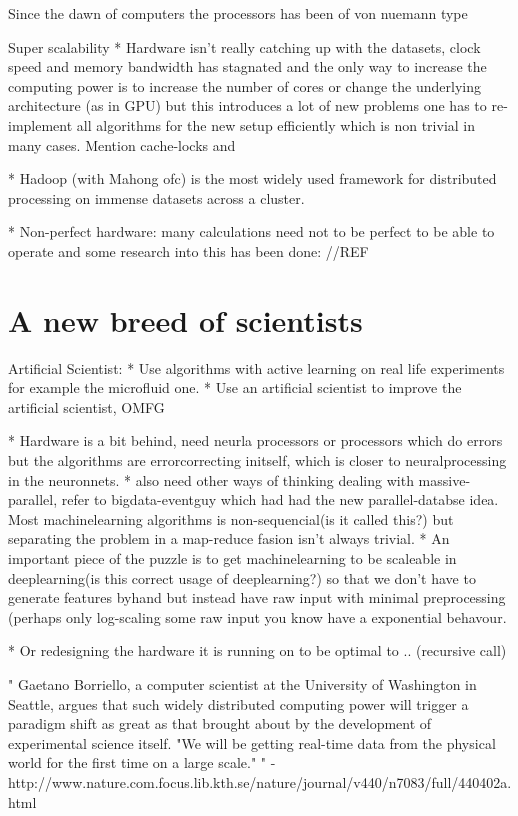 \documentclass{article}
\begin{document}

    Since the dawn of computers the processors has been of von nuemann type


    Super scalability
    * Hardware isn't really catching up with the datasets, clock speed and
    memory bandwidth has
    stagnated and the only way to increase the computing power is to increase
    the number of cores or change the underlying architecture (as in GPU) but 
    this introduces a lot of new problems one has to re-implement all
    algorithms for the new setup efficiently which is non trivial in many
    cases. Mention cache-locks and

    * Hadoop (with Mahong ofc) is the most widely used framework for
    distributed processing on immense datasets across a cluster. 

    * Non-perfect hardware: many calculations need not to be perfect to be able
    to operate and some research into this has been done: //REF

\section{A new breed of scientists}
    Artificial Scientist: 
    * Use algorithms with active learning on real life experiments for example the
    microfluid one.
    * Use an artificial scientist to improve the artificial scientist, OMFG

    * Hardware is a bit  behind, need neurla processors or processors which do
    errors but the algorithms are errorcorrecting initself, which is closer to
    neuralprocessing in the neuronnets.
    * also need other ways of thinking dealing with massive-parallel, refer to
    bigdata-eventguy which had had the new parallel-databse idea. Most
    machinelearning algorithms is non-sequencial(is it called this?) but separating
    the problem in a map-reduce fasion isn't always trivial.
    * An important piece of the puzzle is to get machinelearning to be scaleable in
    deeplearning(is this correct usage of deeplearning?) so that we don't have to
    generate features byhand but instead have raw input with minimal preprocessing
    (perhaps only log-scaling some raw input you know have a exponential behavour.

    * Or redesigning the hardware it is running on to be optimal to .. (recursive
    call)


"
Gaetano Borriello, a computer scientist at the University of Washington in
Seattle, argues that such widely distributed computing power will trigger a
paradigm shift as great as that brought about by the development of
experimental science itself. "We will be getting real-time data from the
physical world for the first time on a large scale."
" - http://www.nature.com.focus.lib.kth.se/nature/journal/v440/n7083/full/440402a.html
\end{document}
